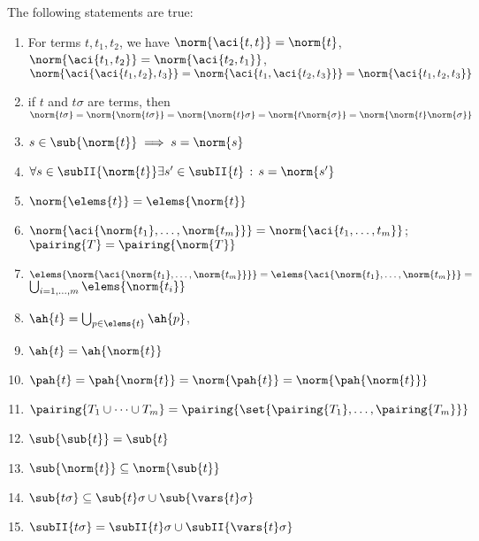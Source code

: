 \begin{lemma}\label{lemma:normprop}
	The following statements are true:
	\begin{enumerate}
\item	\label{pACI}         For terms $t, t_1,t_2$, we have $\norm{\aci{t, t}} = \norm{t}$, $\norm{\aci{t_1, t_2}}=\norm{\aci{t_2, t_1}}$, $\norm{\aci{\aci{t_1, t_2},  t_3}} = \norm{\aci{t_1, \aci{t_2, t_3}}} = \norm{\aci{t_1, t_2, t_3}}$
\item 	\label{pNormNorm}      if $t$ and $t\sigma$ are terms, then  $\norm{t\sigma}=\norm{\norm{t\sigma}}=\norm{\norm{t}\sigma}=\norm{t\norm{\sigma}}=\norm{\norm{t}\norm{\sigma}}$

		\item	\label{pSubNorm}     $ s\in\sub{\norm{t}} \implies s=\norm{s}$	



		\item	\label{pSubNormHasProimage}           $ \forall s\in\subII{\norm{t}} \exists s' \in \subII{t} \,:\, s=\norm{s'}$	



		\item \label{pNormElems}       $\norm{\elems{t}} = \elems{\norm{t}}$ 
		
		\item \label{pNormDotNorm}        $\norm{\aci{\norm{t_1}, \dots{}, \norm{t_m}}}=\norm{\aci{t_1, \dots, t_m}}$; $\pairing{T} = \pairing{\norm{T}}$



		\item \label{pDotNormElems}       $\elems{\norm{\aci{\norm{t_1}, \dots, \norm{t_m}}}}={\elems{\aci{\norm{t_1}, \dots, \norm{t_m}}}} =$  \\ $\bigcup_{i=1,\dots,m}\elems{\norm{t_i}}$ 


		\item \label{pAhList}$\ah{t} = \bigcup_{p\in\elems{t}}\ah{p}$, \item \label{pAhNorm}                     ${\ah{t}} = \ah{\norm{t}}$

		\item \label{pPahNorm}                $\pah{t}=\pah{\norm{t}}=\norm{\pah{t}}=\norm{\pah{\norm{t}}}$
		\item \label{pPairingOfPairing}          $\pairing{T_1\cup\dots\cup T_m} = \pairing{\set{\pairing{T_1},\dots,\pairing{T_m}}}$
\item \label{pSubSubSub}            $\sub{\sub{t}} = \sub{t}$           
		\item \label{pNormSub}	$\sub{\norm{t}}\subseteq \norm{\sub{t}}$
 		\item	\label{pSepVar}$\sub{t\sigma}\subseteq \sub{t}\sigma\cup\sub{\vars{t}\sigma}$
		\item	\label{pSepVarII}          $\subII{t\sigma} = \subII{t}\sigma\cup\subII{\vars{t}\sigma}$


\end{enumerate}
\end{lemma}
